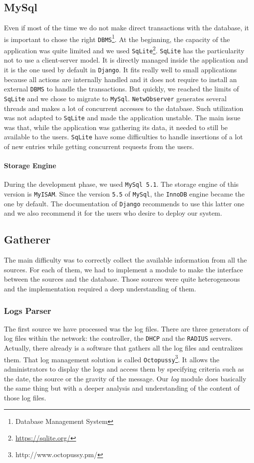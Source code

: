 \subsection{MySql}
Even if most of the time we do not make direct transactions with the database, it is important to chose the right \texttt{DBMS}\footnote{Database Management System}. At the beginning, the capacity of the application was quite limited and we used \texttt{SqLite}\footnote{\url{https://sqlite.org/}}. \texttt{SqLite} has the particularity not to use a client-server model. It is directly managed inside the application and it is the one used by default in \texttt{Django}. It fits really well to small applications because all actions are internally handled and it does not require to install an external \texttt{DBMS} to handle the transactions. But quickly, we reached the limits of \texttt{SqLite} and we chose to migrate to \texttt{MySql}. \texttt{NetwObserver} generates several threads and makes a lot of concurrent accesses to the database. Such utilization was not adapted to \texttt{SqLite} and made the application unstable. The main issue was that, while the application was gathering its data, it needed to still be available to the users. \texttt{SqLite} have some difficulties to handle insertions of a lot of new entries while getting concurrent requests from the users.


\paragraph*{Storage Engine} During the development phase, we used \texttt{MySql 5.1}. The storage engine of this version is \texttt{MyISAM}. Since the version \texttt{5.5} of \texttt{MySql}, the \texttt{InnoDB} engine became the one by default. The documentation of \texttt{Django} recommends to use this latter one and we also recommend it for the users who desire to deploy our system.

\subsection{Gatherer}
The main difficulty was to correctly collect the available information from all the sources. For each of them, we had to implement a module to make the interface between the sources and the database. Those sources were quite heterogeneous and the implementation required a deep understanding of them. 

\subsubsection{Logs Parser}
The first source we have processed was the log files. There are three generators of log files within the network: the controller, the \texttt{DHCP} and the \texttt{RADIUS} servers. Actually, there already is a software that gathers all the log files and centralizes them. That log management solution is called \texttt{Octopussy}\footnote{http://www.octopussy.pm/}. It allows the administrators to display the logs and access them by specifying criteria such as the date, the source or the gravity of the message. Our \emph{log} module does basically the same thing but with a deeper analysis and understanding of the content of those log files. 
